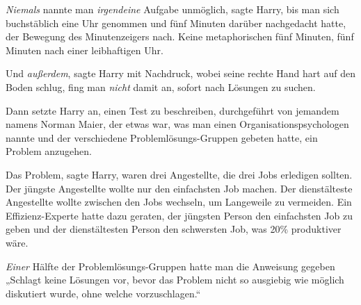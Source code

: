 \emph{Niemals} nannte man \emph{irgendeine} Aufgabe unmöglich, sagte Harry, bis man sich buchstäblich eine Uhr genommen und fünf Minuten darüber nachgedacht hatte, der Bewegung des Minutenzeigers nach. Keine metaphorischen fünf Minuten, fünf Minuten nach einer leibhaftigen Uhr.

Und \emph{außerdem}, sagte Harry mit Nachdruck, wobei seine rechte Hand hart auf den Boden schlug, fing man \emph{nicht} damit an, sofort nach Lösungen zu suchen.

Dann setzte Harry an, einen Test zu beschreiben, durchgeführt von jemandem namens Norman Maier, der etwas war, was man einen Organisationspsychologen nannte und der verschiedene Problemlösungs-Gruppen gebeten hatte, ein Problem anzugehen.

Das Problem, sagte Harry, waren drei Angestellte, die drei Jobs erledigen sollten. Der jüngste Angestellte wollte nur den einfachsten Job machen. Der dienstälteste Angestellte wollte zwischen den Jobs wechseln, um Langeweile zu vermeiden. Ein Effizienz-Experte hatte dazu geraten, der jüngsten Person den einfachsten Job zu geben und der dienstältesten Person den schwersten Job, was 20\% produktiver wäre.

\emph{Einer} Hälfte der Problemlösungs-Gruppen hatte man die Anweisung gegeben
„Schlagt keine Lösungen vor, bevor das Problem nicht so ausgiebig wie möglich diskutiert wurde, ohne welche vorzuschlagen.“

